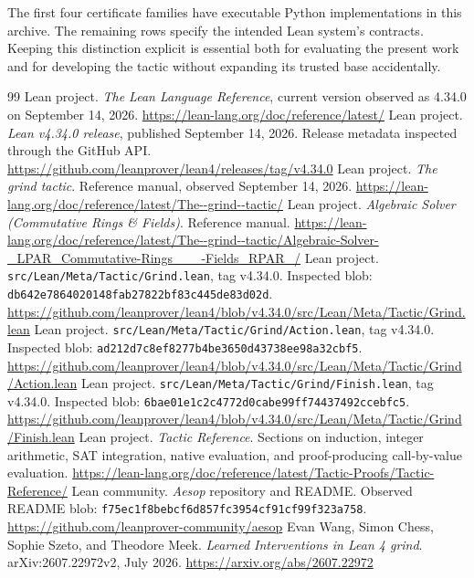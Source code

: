 \documentclass[11pt,a4paper]{article}
\newcommand{\codepath}[1]{\nolinkurl{#1}}
\begin{document}
The first four certificate families have executable Python implementations in this archive. The remaining rows specify the intended Lean system's contracts. Keeping this distinction explicit is essential both for evaluating the present work and for developing the tactic without expanding its trusted base accidentally.

\newpage
\begin{thebibliography}{99}
\small
{} Lean project. \emph{The Lean Language Reference}, current version observed as 4.34.0 on September 14, 2026. \url{https://lean-lang.org/doc/reference/latest/}
 Lean project. \emph{Lean v4.34.0 release}, published September 14, 2026. Release metadata inspected through the GitHub API. \url{https://github.com/leanprover/lean4/releases/tag/v4.34.0}
 Lean project. \emph{The grind tactic}. Reference manual, observed September 14, 2026. \url{https://lean-lang.org/doc/reference/latest/The--grind--tactic/}
 Lean project. \emph{Algebraic Solver (Commutative Rings \& Fields)}. Reference manual. \url{https://lean-lang.org/doc/reference/latest/The--grind--tactic/Algebraic-Solver-_LPAR_Commutative-Rings___-Fields_RPAR_/}
 Lean project. \codepath{src/Lean/Meta/Tactic/Grind.lean}, tag v4.34.0. Inspected blob: \texttt{db642e7864020148fab27822bf83c445de83d02d}. \url{https://github.com/leanprover/lean4/blob/v4.34.0/src/Lean/Meta/Tactic/Grind.lean}
 Lean project. \codepath{src/Lean/Meta/Tactic/Grind/Action.lean}, tag v4.34.0. Inspected blob: \texttt{ad212d7c8ef8277b4be3650d43738ee98a32cbf5}. \url{https://github.com/leanprover/lean4/blob/v4.34.0/src/Lean/Meta/Tactic/Grind/Action.lean}
 Lean project. \codepath{src/Lean/Meta/Tactic/Grind/Finish.lean}, tag v4.34.0. Inspected blob: \texttt{6bae01e1c2c4772d0cabe99ff74437492ccebfc5}. \url{https://github.com/leanprover/lean4/blob/v4.34.0/src/Lean/Meta/Tactic/Grind/Finish.lean}
 Lean project. \emph{Tactic Reference}. Sections on induction, integer arithmetic, SAT integration, native evaluation, and proof-producing call-by-value evaluation. \url{https://lean-lang.org/doc/reference/latest/Tactic-Proofs/Tactic-Reference/}
 Lean community. \emph{Aesop} repository and README. Observed README blob: \texttt{f75ec1f8bebcf6d857fc3954cf91cf99f323a758}. \url{https://github.com/leanprover-community/aesop}
 Evan Wang, Simon Chess, Sophie Szeto, and Theodore Meek. \emph{Learned Interventions in Lean 4 grind}. arXiv:2607.22972v2, July 2026. \url{https://arxiv.org/abs/2607.22972}

\end{thebibliography}
\end{document}
